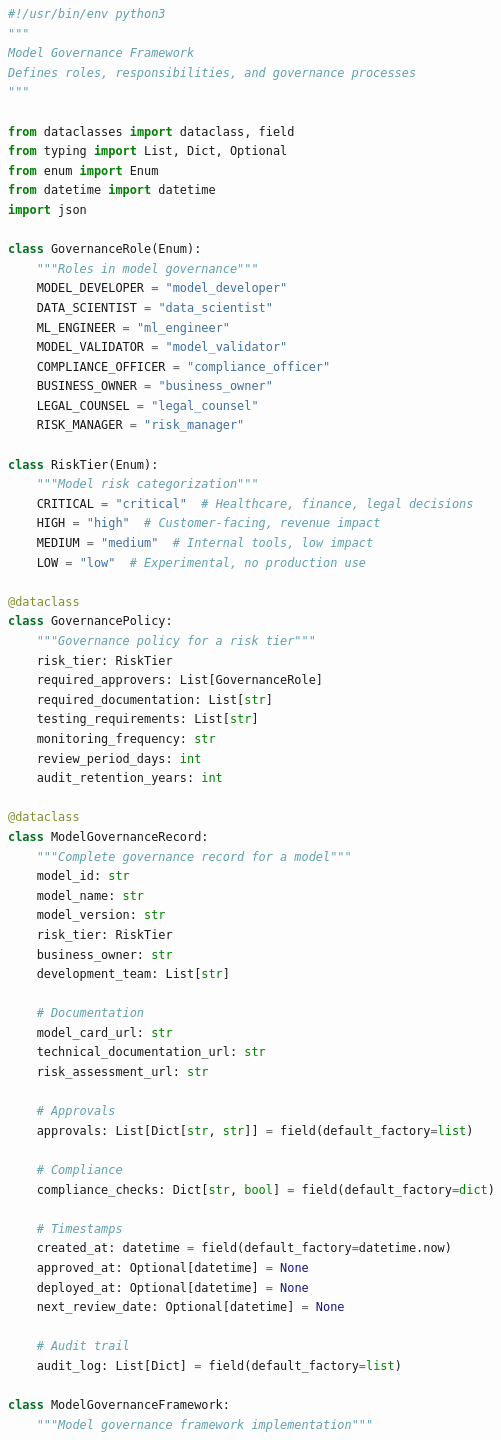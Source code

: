 \begin{lstlisting}[language=Python, caption=Model Governance Framework Structure]
#!/usr/bin/env python3
"""
Model Governance Framework
Defines roles, responsibilities, and governance processes
"""

from dataclasses import dataclass, field
from typing import List, Dict, Optional
from enum import Enum
from datetime import datetime
import json

class GovernanceRole(Enum):
    """Roles in model governance"""
    MODEL_DEVELOPER = "model_developer"
    DATA_SCIENTIST = "data_scientist"
    ML_ENGINEER = "ml_engineer"
    MODEL_VALIDATOR = "model_validator"
    COMPLIANCE_OFFICER = "compliance_officer"
    BUSINESS_OWNER = "business_owner"
    LEGAL_COUNSEL = "legal_counsel"
    RISK_MANAGER = "risk_manager"

class RiskTier(Enum):
    """Model risk categorization"""
    CRITICAL = "critical"  # Healthcare, finance, legal decisions
    HIGH = "high"  # Customer-facing, revenue impact
    MEDIUM = "medium"  # Internal tools, low impact
    LOW = "low"  # Experimental, no production use

@dataclass
class GovernancePolicy:
    """Governance policy for a risk tier"""
    risk_tier: RiskTier
    required_approvers: List[GovernanceRole]
    required_documentation: List[str]
    testing_requirements: List[str]
    monitoring_frequency: str
    review_period_days: int
    audit_retention_years: int

@dataclass
class ModelGovernanceRecord:
    """Complete governance record for a model"""
    model_id: str
    model_name: str
    model_version: str
    risk_tier: RiskTier
    business_owner: str
    development_team: List[str]

    # Documentation
    model_card_url: str
    technical_documentation_url: str
    risk_assessment_url: str

    # Approvals
    approvals: List[Dict[str, str]] = field(default_factory=list)

    # Compliance
    compliance_checks: Dict[str, bool] = field(default_factory=dict)

    # Timestamps
    created_at: datetime = field(default_factory=datetime.now)
    approved_at: Optional[datetime] = None
    deployed_at: Optional[datetime] = None
    next_review_date: Optional[datetime] = None

    # Audit trail
    audit_log: List[Dict] = field(default_factory=list)

class ModelGovernanceFramework:
    """Model governance framework implementation"""


\end{lstlisting}
